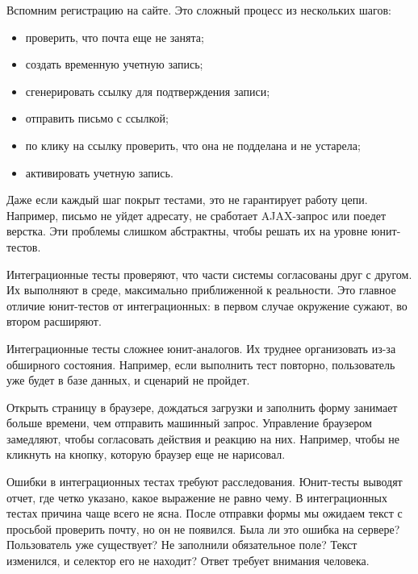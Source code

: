 Вспомним регистрацию на сайте. Это сложный процесс из нескольких шагов:

\begin{itemize}

\item
  проверить, что почта еще не занята;

\item
  создать временную учетную запись;

\item
  сгенерировать ссылку для подтверждения записи;

\item
  отправить письмо с ссылкой;

\item
  по клику на ссылку проверить, что она не подделана и не устарела;

\item
  активировать учетную запись.

\end{itemize}

Даже если каждый шаг покрыт тестами, это не гарантирует работу цепи. Например,
письмо не уйдет адресату, не сработает AJAX-запрос или поедет верстка. Эти
проблемы слишком абстрактны, чтобы решать их на уровне юнит-тестов.

Интеграционные тесты проверяют, что части системы согласованы друг с другом. Их
выполняют в среде, максимально приближенной к реальности. Это главное отличие
юнит-тестов от интеграционных: в первом случае окружение сужают, во втором
расширяют.

Интеграционные тесты сложнее юнит-аналогов. Их труднее организовать из-за
обширного состояния. Например, если выполнить тест повторно, пользователь уже
будет в базе данных, и сценарий не пройдет.

Открыть страницу в браузере, дождаться загрузки и заполнить форму занимает
больше времени, чем отправить машинный запрос. Управление браузером замедляют,
чтобы согласовать действия и реакцию на них. Например, чтобы не кликнуть на
кнопку, которую браузер еще не нарисовал.

Ошибки в интеграционных тестах требуют расследования. Юнит-тесты выводят отчет,
где четко указано, какое выражение не равно чему. В интеграционных тестах
причина чаще всего не ясна. После отправки формы мы ожидаем текст с просьбой
проверить почту, но он не появился. Была ли это ошибка на сервере? Пользователь
уже существует? Не заполнили обязательное поле? Текст изменился, и селектор его
не находит? Ответ требует внимания человека.

